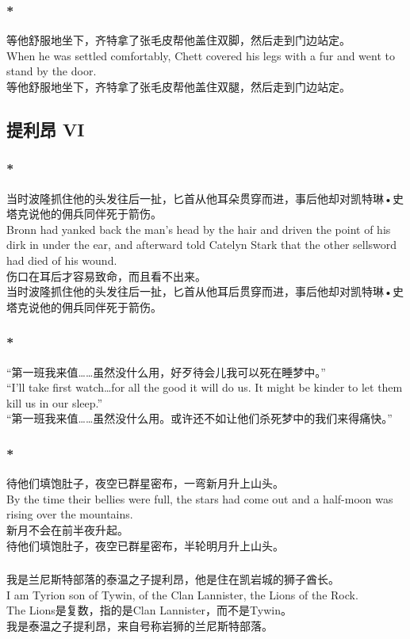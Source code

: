 \documentclass[12pt,a4paper]{article}
\newcommand{\h}[1]{{\color{red}#1}\\}
\newcommand{\la}[1]{{\color{blue}#1}\\}
\begin{document}
\subsubsection{\color{red}*}\la{
	等他舒服地坐下，齐特拿了张毛皮帮他盖住双脚，然后走到门边站定。\\
	When he was settled comfortably, Chett covered his legs with a fur and went to stand by the door.}
	等他舒服地坐下，齐特拿了张毛皮帮他盖住双腿，然后走到门边站定。
			
\subsection{提利昂 VI}
\subsubsection{\color{red}*}\la{
	当时波隆抓住他的头发往后一扯，匕首从他耳朵贯穿而进，事后他却对凯特琳•史塔克说他的佣兵同伴死于箭伤。\\
	Bronn had yanked back the man's head by the hair and driven the point of his dirk in under the ear, and afterward told Catelyn Stark that the other sellsword had died of his wound.}\h{
	伤口在耳后才容易致命，而且看不出来。}
	当时波隆抓住他的头发往后一扯，匕首从他耳后贯穿而进，事后他却对凯特琳•史塔克说他的佣兵同伴死于箭伤。
	
\subsubsection{\color{red}*}\la{
	“第一班我来值……虽然没什么用，好歹待会儿我可以死在睡梦中。”\\
	“I'll take first watch\ldots for all the good it will do us. It might be kinder to let them kill us in our sleep.”}
	“第一班我来值……虽然没什么用。或许还不如让他们杀死梦中的我们来得痛快。”
	
\subsubsection{\color{red}*}\la{
	待他们填饱肚子，夜空已群星密布，一弯新月升上山头。\\
	By the time their bellies were full, the stars had come out and a half-moon was rising over the mountains.}\h{
	新月不会在前半夜升起。}
	待他们填饱肚子，夜空已群星密布，半轮明月升上山头。
	
\subsubsection{}\la{
	我是兰尼斯特部落的泰温之子提利昂，他是住在凯岩城的狮子酋长。\\
	I am Tyrion son of Tywin, of the Clan Lannister, the Lions of the Rock.}\h{
	The Lions是复数，指的是Clan Lannister，而不是Tywin。}
	我是泰温之子提利昂，来自号称岩狮的兰尼斯特部落。
	
\end{document}
